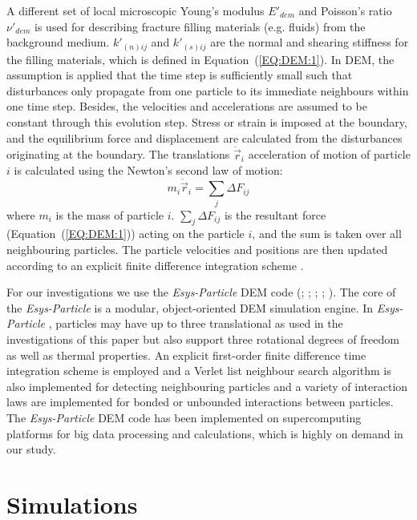 \documentclass[review,authoryear]{elsarticle}
\newcommand{\esysparticle}{\textit{Esys-Particle }}
\begin{document}
A different set of local microscopic Young's modulus $E'_{dem}$ and Poisson's ratio $\nu'_{dem}$ is used for describing fracture filling materials (e.g. fluids) from the background medium. $k'_{(n)ij}$ and $k'_{(s)ij}$ are the normal and shearing stiffness for the filling materials, which is defined in Equation~(\ref{EQ:DEM:1}). In DEM, the assumption is applied that the time step is sufficiently small such that disturbances only propagate from one particle to its immediate neighbours 
within one time step. Besides, the velocities and accelerations are assumed to be constant through this evolution step. 
Stress or strain is imposed at the boundary, and the equilibrium force and displacement are calculated from the disturbances originating at the boundary. 
The translations $\ddot{\vec{r}}_{i}$ acceleration of motion of particle $i$ is calculated using the Newton's second law of motion:
\begin{equation}\label{EQ:TRANS}
  m_{i}\ddot{\vec{r}}_{i}=\sum\limits_{j}{\Delta F_{ij}}
\end{equation}
where $m_{i}$ is the mass of particle $i$. $\sum\limits_{j}{\Delta F_{ij}}$ is the resultant force (Equation~(\ref{EQ:DEM:1})) acting on the particle $i$, and the sum is taken over all neighbouring particles. The particle velocities and positions are then updated according to an explicit finite difference integration scheme \citep{munjiza2004front}. 

For our investigations we use the \esysparticle DEM code (\cite{weatherley2013esys}; \cite{wang2008discrete}; \cite{griffa2011vibration}; \cite{abe2012discrete}; \cite{mora2015lattice}). The core of the \esysparticle is a modular, object-oriented DEM simulation engine. In \esysparticle, particles may have up to three translational 
as used in the investigations of this paper but also support three rotational degrees of freedom as well as thermal properties. 
An explicit first-order finite difference time integration scheme is employed and a Verlet list neighbour search algorithm is also implemented for detecting neighbouring particles and a variety of interaction laws are implemented for bonded or unbounded interactions between particles. The \esysparticle DEM code has been implemented on supercomputing platforms for big data processing and calculations, which is highly on demand in our study. 

\section{Simulations}\label{SEC:MEDIA}
\end{document}
